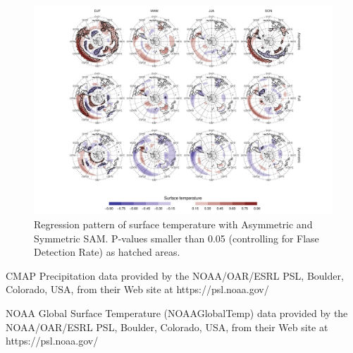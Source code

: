\documentclass[]{ametsocV5}
\begin{document}
\begin{figure}
\includegraphics{regr-air-season-1} \caption[Regression pattern of surface temperature with Asymmetric and Symmetric SAM]{Regression pattern of surface temperature with Asymmetric and Symmetric SAM. P-values smaller than 0.05 (controlling for Flase Detection Rate) as hatched areas.}\label{fig:regr-air-season}
\end{figure}

\acknowledgments

CMAP Precipitation data provided by the NOAA/OAR/ESRL PSL, Boulder,
Colorado, USA, from their Web site at https://psl.noaa.gov/

NOAA Global Surface Temperature (NOAAGlobalTemp) data provided by the
NOAA/OAR/ESRL PSL, Boulder, Colorado, USA, from their Web site at
https://psl.noaa.gov/



\appendix

\end{document}
